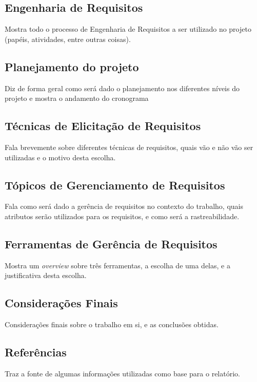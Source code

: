 \subsection{Engenharia de Requisitos}
Mostra todo o processo de Engenharia de Requisitos a ser utilizado no projeto (papéis, atividades, entre outras coisas).
\subsection{Planejamento do projeto}
Diz de forma geral como será dado o planejamento nos diferentes níveis do projeto e mostra o andamento do cronograma
\subsection{Técnicas de Elicitação de Requisitos}
Fala brevemente sobre diferentes técnicas de requisitos, quais vão e não vão ser utilizadas e o motivo desta escolha.
\subsection{Tópicos de Gerenciamento de Requisitos}
Fala como será dado a gerência de requisitos no contexto do trabalho, quais atributos serão utilizados para os requisitos, e como será a rastreabilidade.
\subsection{Ferramentas de Gerência de Requisitos}
Mostra um \emph{overview} sobre três ferramentas, a escolha de uma delas, e a justificativa desta escolha.
\subsection{Considerações Finais}
Considerações finais sobre o trabalho em si, e as conclusões obtidas.
\subsection{Referências}
Traz a fonte de algumas informações utilizadas como base para o relatório.
